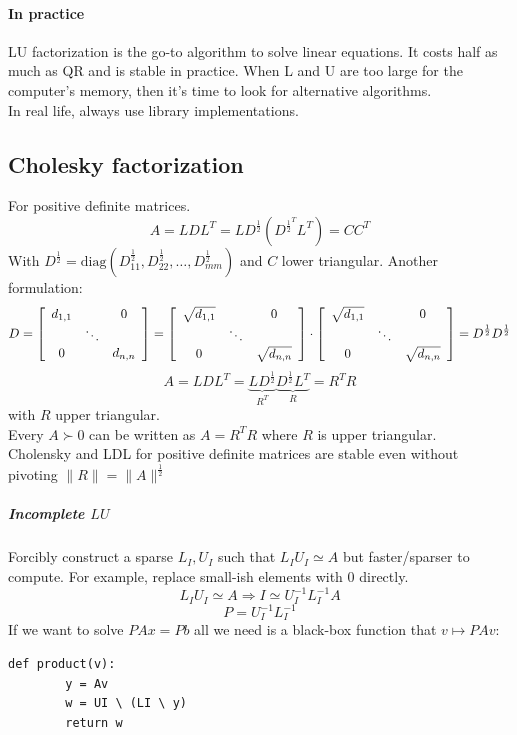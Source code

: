 \documentclass[10pt]{report}
\begin{document}
\paragraph{In practice} LU factorization is the go-to algorithm to solve linear equations. It costs half as much as QR and is stable in practice. When L and U are too large for the computer's memory, then it's time to look for alternative algorithms.\\
In real life, always use library implementations.
\subsection{Cholesky factorization}
For positive definite matrices.
$$A=LDL^T=LD^{\frac{1}{2}}(D^{\frac{1}{2}^T}L^T)=CC^T$$
With $D^{\frac{1}{2}}=\text{diag}(D^{\frac{1}{2}}_{11}, D^{\frac{1}{2}}_{22},\ldots,D^{\frac{1}{2}}_{mm})$ and $C$ lower triangular. Another formulation:
$$D = \left[\begin{array}{c c c}
d_{1,1}& & 0\\
& \ddots & \\
0 & & d_{n,n}
\end{array}\right] = \left[\begin{array}{c c c}
\sqrt{d_{1,1}}& & 0\\
& \ddots & \\
0 & & \sqrt{d_{n,n}}
\end{array}\right]\cdot\left[\begin{array}{c c c}
\sqrt{d_{1,1}}& & 0\\
& \ddots & \\
0 & & \sqrt{d_{n,n}}
\end{array}\right] = D^{\frac{1}{2}}D^{\frac{1}{2}}$$
$$A = LDL^T = \underset{R^T}{\underbrace{LD^{\frac{1}{2}}}}\underset{R}{\underbrace{D^{\frac{1}{2}}L^T}} = R^T R$$ with $R$ upper triangular.\\
Every $A \succ 0$ can be written as $A = R^T R$ where $R$ is upper triangular.\\
Cholensky and LDL for positive definite matrices are stable even without pivoting $\|R\|=\|A\|^{\frac{1}{2}}$
\subparagraph{Incomplete $LU$} Forcibly construct a sparse $L_I, U_I$ such that $L_IU_I\simeq A$ but faster/sparser to compute. For example, replace small-ish elements with 0 directly.
$$L_IU_I\simeq A \Rightarrow I \simeq U_I^{-1}L_I^{-1}A$$ $$P = U_I^{-1}L_I^{-1}$$
If we want to solve $PAx=Pb$ all we need is a black-box function that $v\mapsto PAv$:
\begin{lstlisting}[style=myPython]
	def product(v):
		y = Av
		w = UI \ (LI \ y)
		return w
\end{lstlisting}
\end{document}
